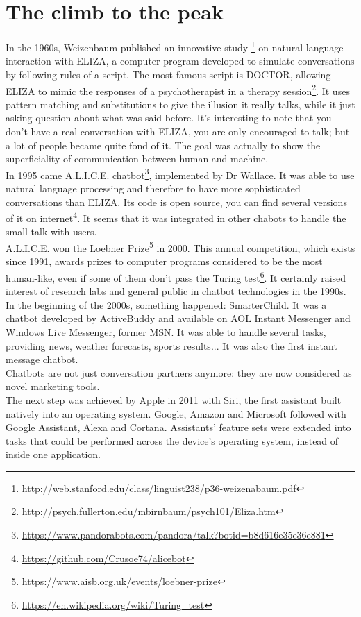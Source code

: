 \documentclass{article}
\begin{document}
\section{The climb to the peak}
In the 1960s, Weizenbaum published an innovative study \footnote{\url{http://web.stanford.edu/class/linguist238/p36-weizenabaum.pdf}} on natural language interaction with ELIZA, a computer program developed to simulate conversations by following rules of a script. The most famous script is DOCTOR, allowing ELIZA to mimic the responses of a psychotherapist in a therapy session\footnote{\url{http://psych.fullerton.edu/mbirnbaum/psych101/Eliza.htm}}. It uses pattern matching and substitutions to give the illusion it really talks, while it just asking question about what was said before. It’s interesting to note that you don’t have a real conversation with ELIZA, you are only encouraged to talk; but a lot of people became quite fond of it. The goal was actually to show the superficiality of communication between human and machine.\\
\break
In 1995 came A.L.I.C.E. chatbot\footnote{\url{https://www.pandorabots.com/pandora/talk?botid=b8d616e35e36e881}}, implemented by Dr Wallace. It was able to use natural language processing and therefore to have more sophisticated conversations than ELIZA. Its code is open source, you can find several versions of it on internet\footnote{\url{https://github.com/Crusoe74/alicebot}}. It seems that it was integrated in other chabots to handle the small talk with users.\\
A.L.I.C.E. won the Loebner Prize\footnote{\url{https://www.aisb.org.uk/events/loebner-prize}} in 2000. This annual competition, which exists since 1991, awards prizes to computer programs considered to be the most human-like, even if some of them don't pass the Turing test\footnote{\url{https://en.wikipedia.org/wiki/Turing_test}}. It certainly raised interest of research labs and general public in chatbot technologies in the 1990s.\\
\break
In the beginning of the 2000s, something happened: SmarterChild. It was a chatbot developed by ActiveBuddy and available on AOL Instant Messenger and Windows Live Messenger, former MSN. It was able to handle several tasks, providing news, weather forecasts, sports results... It was also the first instant message chatbot.\\
Chatbots are not just conversation partners anymore: they are now considered as novel marketing tools.\\
\break
The next step was achieved by Apple in 2011 with Siri, the first assistant built natively into an operating system. Google, Amazon and Microsoft followed with Google Assistant, Alexa and Cortana. Assistants’ feature sets were extended into tasks that could be performed across the device’s operating system, instead of inside one application.\\
\end{document}
